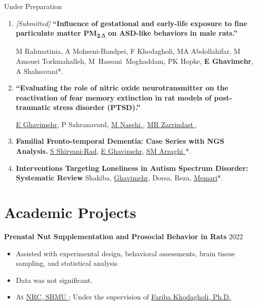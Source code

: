 \documentclass[letterpaper,11pt]{article} %
\begin{document}
\large{Under Preparation} \normalsize
\vspace{-0.5\baselineskip}
\begin{enumerate}

\item \hypertarget{art6}{\textit{[Submitted]} \textbf{“Influence of gestational and early-life exposure to fine particulate matter PM\textsubscript{2.5} on ASD-like behaviors in male rats.”}} M Rahmatinia, A Mohseni-Bandpei, F Khodagholi, MA Abdollahifar, M Amouei Torkmahalleh, M Hassani Moghaddam, PK Hopke, \textbf{E Ghavimehr}, A Shahsavani*.

\item \hypertarget{art7}{\textbf{“Evaluating the role of nitric oxide neurotransmitter on the reactivation of fear memory extinction in rat models of post-traumatic stress disorder (PTSD).”}} \underline{E Ghavimehr}, P Sahranavard, \hyperlink{Nasehi}{M Nasehi \faArrowAltCircleDown[regular]}, \hyperlink{Zarrindast}{MR Zarrindast \faArrowAltCircleDown[regular]}.

\item \textbf{Familial Fronto-temporal Dementia: Case Series with NGS Analysis.} \href{https://scholar.google.com/citations?hl=en\&user=Ox4mhgwAAAAJ}{S Shirvani-Rad}, \underline{E Ghavimehr}, \hyperlink{Arzaghi}{SM Arzaghi \faArrowAltCircleDown[regular]}*.

\item \textbf{Interventions Targeting Loneliness in Autism Spectrum Disorder: Systematic Review} Shakiba, \underline{Ghavimehr}, Dorsa, Reza, \href{https://scholar.google.com/citations?hl=en\&user=W4-bYsgAAAAJ}{Memari}*.


\end{enumerate}

\section{Academic Projects}
\textbf{Prenatal Nut Supplementation and Prosocial Behavior in Rats} \hfill \footnotesize{2022} \normalsize
\vspace{-0.5\baselineskip}
\begin{itemize}
\item Assisted with experimental design, behavioral assessments, brain tissue sampling, and statistical analysis
\item Data was not significant.
\item At \hyperlink{NRC}{NRC, SBMU \faArrowAltCircleUp[regular]}; Under the supervision of \href{https://scholar.google.com/citations?user=MtZcJ1EAAAAJ\&hl=en\&oi=ao}{Fariba Khodagholi, Ph.D.}
\end{itemize}
\end{document}
